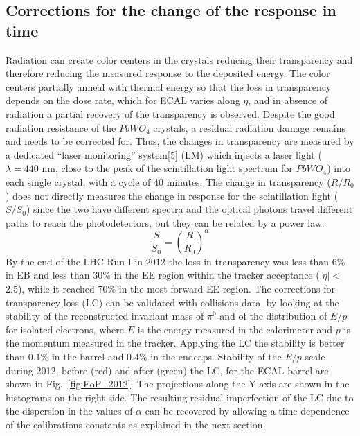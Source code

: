 \documentclass[journal]{IEEEtran}
\begin{document}
\subsection{Corrections for the change of the response in time}
Radiation can create color centers in the crystals reducing their transparency and therefore reducing the measured response to the deposited energy. The color centers partially anneal with thermal energy so that the loss in transparency depends on the dose rate, which for ECAL varies along $\eta$, and in absence of radiation a partial recovery of the transparency is observed.
Despite the good radiation resistance of the $PbWO_4$ crystals, a residual radiation damage remains and needs to be corrected for. Thus, the changes in transparency are measured by a dedicated ``laser monitoring'' system[5] (LM) which injects a laser light ($\lambda=440$ nm, close to the peak of the scintillation light spectrum for $PbWO_4$) into each single crystal, with a cycle of 40 minutes. The change in transparency ($R/R_0$) does not directly measures the change in response for the scintillation light ($S/S_0$) since the two have different spectra and the optical photons travel different paths to reach the photodetectors, but they can be related by a power law:
\begin{equation}
\frac{S}{S_0} = \left(\frac{R}{R_0}\right)^\alpha
\end{equation}
By the end of the LHC Run I in 2012 the loss in transparency was less than 6\% in EB and less than 30\% in the EE region within the tracker acceptance ($\vert\eta\vert<$2.5), while it reached 70\% in the most forward EE region. The corrections for transparency loss (LC) can be validated with collisions data, by looking at the stability of the reconstructed invariant mass of $\pi^0$ and of the distribution of $E/p$ for isolated electrons, where $E$ is the energy measured in the calorimeter and $p$ is the momentum measured in the tracker. Applying the LC the stability is better than 0.1\% in the barrel and 0.4\% in the endcaps.  Stability of the $E/p$ scale during 2012, before (red) and after (green) the LC, for the ECAL barrel are shown in Fig.~\ref{fig:EoP_2012}. The projections along the Y axis are shown in the histograms on the right side.
 The resulting residual imperfection of the LC due to the dispersion in the values of $\alpha$ can be recovered by allowing a time dependence of the calibrations constants as explained in the next section. 
%
\end{document}
